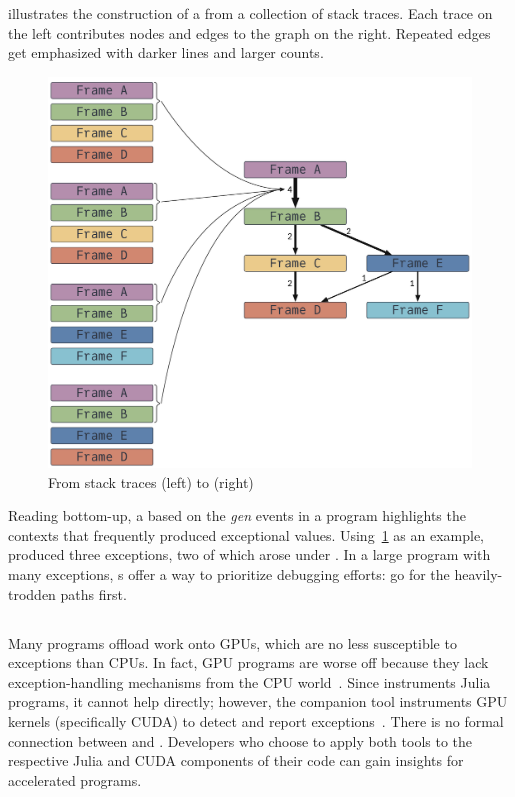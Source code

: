 \documentclass{juliacon}
\begin{document}
 illustrates the construction of a \CSTG{} from a collection of stack traces.
Each trace on the left contributes nodes and edges to the graph on the right.
Repeated edges get emphasized with darker lines and larger counts.

\begin{figure}[t]
  \centering
  \includegraphics[width=0.9\columnwidth]{./fig/cstg_static_diagram.pdf}
  \caption{From stack traces (left) to \CSTG{} (right)}
  \label{fig:cstg_demo}
\end{figure}

Reading bottom-up, a \CSTG{} based on the \emph{gen} events in a program
highlights the contexts that frequently produced exceptional values.
Using~\cref{fig:cstg_demo} as an example,  produced
three exceptions, two of which arose under .
In a large program with many exceptions, \CSTG{}s offer a way to prioritize
debugging efforts: go for the heavily-trodden paths first.


\subsection{\GPUFPX{}}
\label{s:gpufpx}

Many programs offload work onto GPUs, which are no less susceptible to \fp{} exceptions than CPUs.
In fact, GPU programs are worse off because they lack exception-handling mechanisms from the CPU world~\cite{llg-soap-2022}.
Since \TF{} instruments Julia programs, it cannot help directly;
however, the companion tool \GPUFPX{} instruments GPU kernels
(specifically CUDA) to detect and report
\fp{} exceptions~\cite{llsflg-hpdc-2023}.
There is no formal connection between \TF{} and \GPUFPX{}.
Developers who choose to apply both tools to the respective Julia and CUDA
components of their code can gain insights for accelerated programs.
\end{document}
